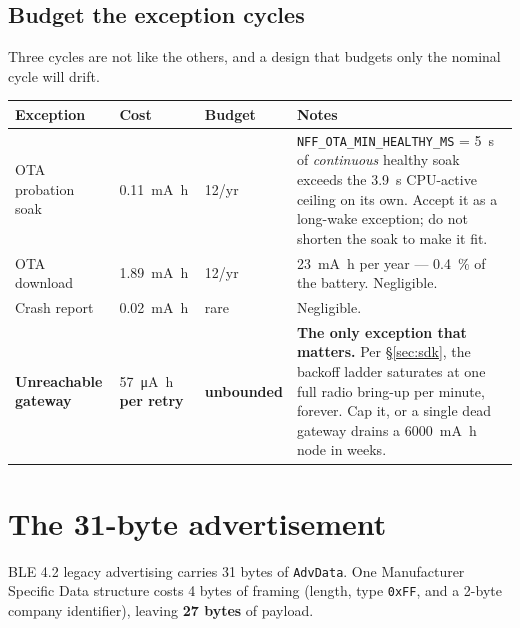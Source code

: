 \documentclass[11pt,a4paper]{article}
\begin{document}
\subsection{Budget the exception cycles}

Three cycles are not like the others, and a design that budgets only the nominal cycle will drift.

\begin{center}
\begin{tabularx}{\textwidth}{lllX}
\toprule
\textbf{Exception} & \textbf{Cost} & \textbf{Budget} & \textbf{Notes} \\
\midrule
OTA probation soak & \SI{0.11}{\milli\ampere\hour} & 12/yr & \texttt{NFF\_OTA\_MIN\_HEALTHY\_MS} = \SI{5}{\second} of \emph{continuous} healthy soak exceeds the \SI{3.9}{\second} CPU-active ceiling on its own. Accept it as a long-wake exception; do not shorten the soak to make it fit. \\
OTA download & \SI{1.89}{\milli\ampere\hour} & 12/yr & \SI{23}{\milli\ampere\hour} per year --- \SI{0.4}{\percent} of the battery. Negligible. \\
Crash report & \SI{0.02}{\milli\ampere\hour} & rare & Negligible. \\
\midrule
\textbf{Unreachable gateway} & \textcolor{warn}{\SI{57}{\micro\ampere\hour} \textbf{per retry}} & \textcolor{warn}{\textbf{unbounded}} & \textbf{The only exception that matters.} Per \S\ref{sec:sdk}, the backoff ladder saturates at one full radio bring-up per minute, forever. Cap it, or a single dead gateway drains a \SI{6000}{\milli\ampere\hour} node in weeks. \\
\bottomrule
\end{tabularx}
\end{center}

\section{The 31-byte advertisement}
\label{sec:adv}

BLE 4.2 legacy advertising carries 31 bytes of \texttt{AdvData}. One Manufacturer Specific Data
structure costs 4 bytes of framing (length, type \texttt{0xFF}, and a 2-byte company identifier),
leaving \textbf{27 bytes} of payload.
\end{document}
